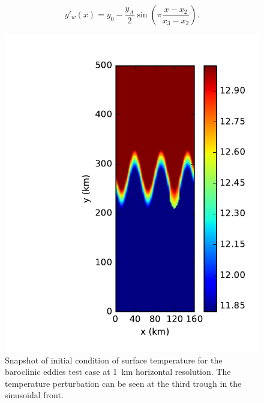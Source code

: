 \begin{equation}
  y'_w(x) = y_0 - \frac{y_A}{2}\sin\left(\pi \frac{x - x_2}{x_3 - x_2}\right).
\end{equation}

\begin{figure}
  \includegraphics{../plots/eddies_snapshot_dx1_initial.pdf}
  \caption{\label{fig:eddies-snapshot_ic} Snapshot of initial condition of surface temperature for the baroclinic eddies test case at \SI{1}{\kilo\metre} horizontal resolution. The temperature perturbation can be seen at the third trough in the sinusoidal front.}
\end{figure}

